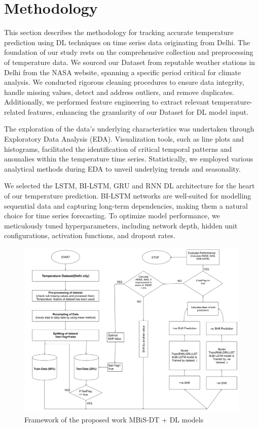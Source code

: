 \documentclass[sn-mathphys,Numbered]{sn-jnl}
\theoremstyle{thmstyleone}
\theoremstyle{thmstyletwo}
\theoremstyle{thmstylethree}
\begin{document}
\section{Methodology}
This section describes the methodology for tracking accurate temperature prediction using DL techniques on time series data originating from Delhi. The foundation of our study rests on the comprehensive collection and preprocessing of temperature data. We sourced our Dataset from reputable weather stations in Delhi from the NASA website, spanning a specific period critical for climate analysis. We conducted rigorous cleaning procedures to ensure data integrity, handle missing values, detect and address outliers, and remove duplicates. Additionally, we performed feature engineering to extract relevant temperature-related features, enhancing the granularity of our Dataset for DL model input.

The exploration of the data's underlying characteristics was undertaken through Exploratory Data Analysis (EDA). Visualization tools, such as line plots and histograms, facilitated the identification of critical temporal patterns and anomalies within the temperature time series. Statistically, we employed various analytical methods during EDA to unveil underlying trends and seasonality.

We selected the LSTM, BI-LSTM, GRU and RNN DL architecture for the heart of our temperature prediction. BI-LSTM networks are well-suited for modelling sequential data and capturing long-term dependencies, making them a natural choice for time series forecasting. To optimize model performance, we meticulously tuned hyperparameters, including network depth, hidden unit configurations, activation functions, and dropout rates.



\begin{figure}[ht!]
\centering
\includegraphics[width=1\textwidth, height=0.9\linewidth]{FlowchartOfjournal.png}
\caption{Framework of the proposed work MBiS-DT + DL models}
\label{fig:Flowchart Of Proposed Work}
\end{figure}
\end{document}
